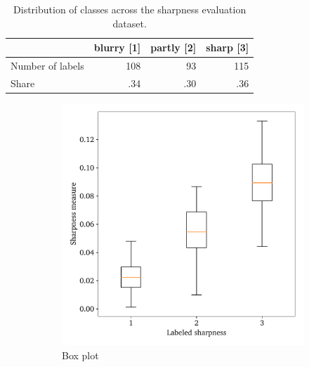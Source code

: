 \begin{table}[htbp]
  \caption[Sharpness dataset distribution]{Distribution of classes across the sharpness evaluation dataset.}\label{tab:sharpness}
  \centering
  \begin{tabular}{lrrr} \toprule
    & blurry [1] & partly [2] & sharp [3]  \\ \midrule
    Number of labels & 108 & 93  & 115 \\
    Share            & .34 & .30 & .36 \\ \bottomrule
  \end{tabular}
\end{table}

\begin{figure}[htbp]
  \centering
  \begin{subfigure}[t]{0.48\textwidth}
    \centering
    \includegraphics[width=\textwidth]{figs/method/box.pdf}
    \caption{Box plot}\label{fig:sharpness-box}
\end{subfigure}%
\hfill
\begin{subfigure}[t]{0.49\textwidth}
  \centering

\end{subfigure}
\end{figure}
